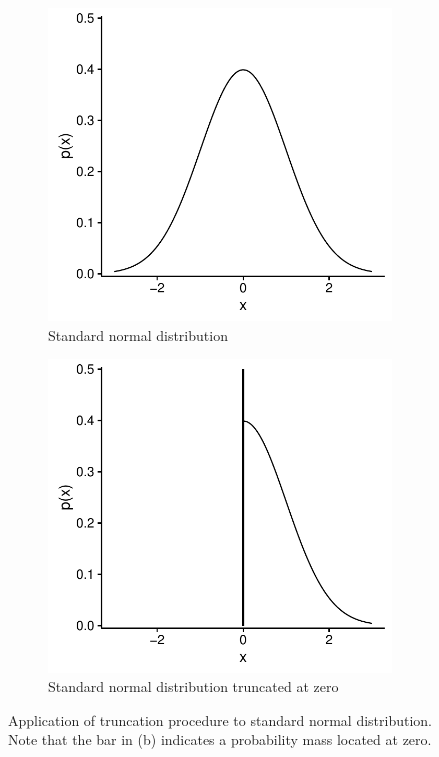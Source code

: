 \documentclass[12pt,oneside]{book}
\begin{document}
\begin{figure}[htbp]
  \centering
  \begin{subfigure}[t]{0.45\textwidth}
      \centering
      \includegraphics[width=\textwidth]{./Figures/normgraph}
      \caption{Standard normal distribution}
  \end{subfigure}
  \begin{subfigure}[t]{0.45\textwidth}
      \centering
      \includegraphics[width=\textwidth]{./Figures/truncgraph}
      \caption{Standard normal distribution truncated at zero}
  \end{subfigure}
  \caption{Application of truncation procedure to standard normal distribution. Note that the bar in (b) indicates a probability mass located at zero.}
  \label{fig:normtruncexample}
\end{figure}
\end{document}
